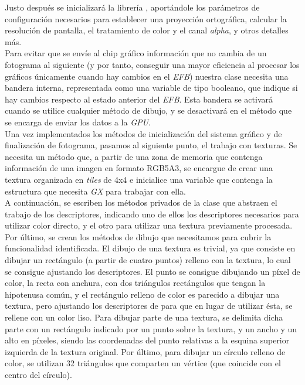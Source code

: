 
Justo después se inicializará la librería , aportándole los parámetros de configuración necesarios para establecer una proyección ortográfica, calcular la resolución de pantalla, el tratamiento de color y el canal \emph{alpha}, y otros detalles más.\\

Para evitar que se envíe al chip gráfico información que no cambia de un fotograma al siguiente (y por tanto, conseguir una mayor eficiencia al procesar los gráficos únicamente cuando hay cambios en el \emph{EFB}) nuestra clase necesita una bandera interna, representada como una variable de tipo booleano, que indique si hay cambios respecto al estado anterior del \emph{EFB}. Esta bandera se activará cuando se utilice cualquier método de dibujo, y se desactivará en el método que se encarga de enviar los datos a la \emph{GPU}.\\

Una vez implementados los métodos de inicialización del sistema gráfico y de finalización de fotograma, pasamos al siguiente punto, el trabajo con texturas. Se necesita un método que, a partir de una zona de memoria que contenga información de una imagen en formato RGB5A3, se encargue de crear una textura organizada en \emph{tiles} de 4x4 e inicialice una variable que contenga la estructura que necesita \emph{GX} para trabajar con ella.\\

A continuación, se escriben los métodos privados de la clase que abstraen el trabajo de los descriptores, indicando uno de ellos los descriptores necesarios para utilizar color directo, y el otro para utilizar una textura previamente procesada.\\

Por último, se crean los métodos de dibujo que necesitamos para cubrir la funcionalidad identificada. El dibujo de una textura es trivial, ya que consiste en dibujar un rectángulo (a partir de cuatro puntos) relleno con la textura, lo cual se consigue ajustando los descriptores. El punto se consigue dibujando un píxel de color, la recta con anchura, con dos triángulos rectángulos que tengan la hipotenusa común, y el rectángulo relleno de color es parecido a dibujar una textura, pero ajustando los descriptores de  para que en lugar de utilizar ésta, se rellene con un color liso. Para dibujar parte de una textura, se delimita dicha parte con un rectángulo indicado por un punto sobre la textura, y un ancho y un alto en píxeles, siendo las coordenadas del punto relativas a la esquina superior izquierda de la textura original. Por último, para dibujar un círculo relleno de color, se utilizan 32 triángulos que comparten un vértice (que coincide con el centro del círculo).\\

